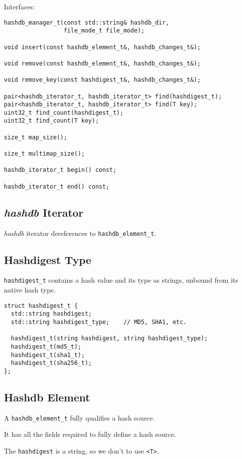 \documentclass[12pt,twoside]{article}
\newcommand{\hdb}{\emph{hashdb}\xspace}
\begin{document}
Interfaces:

\begin{small}
\begin{verbatim}
hashdb_manager_t(const std::string& hashdb_dir,
                 file_mode_t file_mode);

void insert(const hashdb_element_t&, hashdb_changes_t&);

void remove(const hashdb_element_t&, hashdb_changes_t&);

void remove_key(const hashdigest_t&, hashdb_changes_t&);

pair<hashdb_iterator_t, hashdb_iterator_t> find(hashdigest_t);
pair<hashdb_iterator_t, hashdb_iterator_t> find(T key);
uint32_t find_count(hashdigest_t);
uint32_t find_count(T key);

size_t map_size();

size_t multimap_size();

hashdb_iterator_t begin() const;

hashdb_iterator_t end() const;
\end{verbatim}
\end{small}

\subsection{\hdb Iterator}
\hdb iterator dereferences to \texttt{hashdb\_element\_t}.

\subsection{Hashdigest Type}
\texttt{hashdigest\_t} contains a hash value and its type
as strings, unbound from its native hash type.
\begin{small}
\begin{verbatim}
struct hashdigest_t {
  std::string hashdigest;
  std::string hashdigest_type;    // MD5, SHA1, etc.

  hashdigest_t(string hashdigest, string hashdigest_type);
  hashdigest_t(md5_t);
  hashdigest_t(sha1_t);
  hashdigest_t(sha256_t);
};
\end{verbatim}
\end{small}

\subsection{Hashdb Element}
A \texttt{hashdb\_element\_t} fully qualifies a hash source.
\begin{compactitem}
\item It has all the fields required to fully define a hash source.
\item The \texttt{hashdigest} is a string, so we don't to use \texttt{<T>}.
\end{compactitem}
\end{document}
